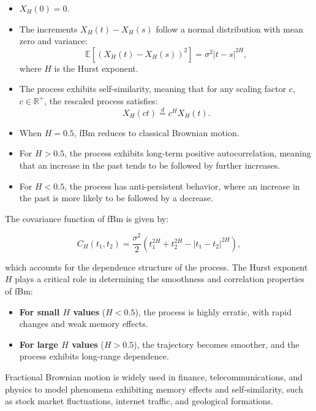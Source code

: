 \documentclass[11pt]{extarticle}
\begin{document}
\begin{itemize}
    \item \( X_H(0) = 0 \).
    \item The increments \( X_H(t) - X_H(s) \) follow a normal distribution with mean zero and variance:
    \begin{equation}
        \mathbb{E} \left[ (X_H(t) - X_H(s))^2 \right] = \sigma^2|t - s|^{2H},
    \end{equation}
    where \( H \) is the Hurst exponent.
    \item The process exhibits self-similarity, meaning that for any scaling factor \( c \), \( c \in \mathbb{R}^+ \), the rescaled process satisfies:
    \begin{equation}
        X_H(ct) \overset{d}{=} c^H X_H(t).
    \end{equation}
    \item When \( H = 0.5 \), fBm reduces to classical Brownian motion.
    \item For \( H > 0.5 \), the process exhibits long-term positive autocorrelation, meaning that an increase in the past tends to be followed by further increases.
    \item For \( H < 0.5 \), the process has anti-persistent behavior, where an increase in the past is more likely to be followed by a decrease.
\end{itemize}

The covariance function of fBm is given by:

\begin{equation}
    C_H(t_1, t_2) = \frac{\sigma^2}{2} \left( t_1^{2H} + t_2^{2H} - |t_1 - t_2|^{2H} \right),
    \label{eq:fbm_covariance}
\end{equation}

which accounts for the dependence structure of the process. The Hurst exponent \( H \) plays a critical role in determining the smoothness and correlation properties of fBm:

\begin{itemize}
    \item \textbf{For small \( H \) values} (\( H < 0.5 \)), the process is highly erratic, with rapid changes and weak memory effects.
    \item \textbf{For large \( H \) values} (\( H > 0.5 \)), the trajectory becomes smoother, and the process exhibits long-range dependence.
\end{itemize}

Fractional Brownian motion is widely used in finance, telecommunications, and physics to model phenomena exhibiting memory effects and self-similarity, such as stock market fluctuations, internet traffic, and geological formations.
\end{document}
